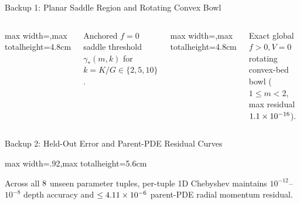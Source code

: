 \documentclass[aspectratio=169,11pt]{beamer}
\newcommand{\smallnote}[1]{{\scriptsize\color{muted}#1\par}}
\begin{document}
\appendix

\begin{frame}[t]{Backup 1: Planar Saddle Region and Rotating Convex Bowl}
\vspace{0.5mm}
\begin{columns}[T,onlytextwidth]
\centering
\begin{adjustbox}{max width=\linewidth,max totalheight=4.8cm}

\end{adjustbox}
\smallnote{Anchored $f=0$ saddle threshold $\gamma_*(m,k)$ for $k=K/G\in\{2,5,10\}$.}

\centering
\begin{adjustbox}{max width=\linewidth,max totalheight=4.8cm}

\end{adjustbox}
\smallnote{Exact global $f>0,V=0$ rotating convex-bed bowl ($1\le m<2$, max residual $1.1\times 10^{-16}$).}
\end{columns}
\end{frame}

\begin{frame}[t]{Backup 2: Held-Out Error and Parent-PDE Residual Curves}
\vspace{1mm}
\centering
\begin{adjustbox}{max width=.92\linewidth,max totalheight=5.6cm}

\end{adjustbox}
\vspace{1mm}
\smallnote{Across all $8$ unseen parameter tuples, per-tuple 1D Chebyshev maintains $10^{-12}$--$10^{-8}$ depth accuracy and $\le4.11\times 10^{-6}$ parent-PDE radial momentum residual.}
\end{frame}
\end{document}
